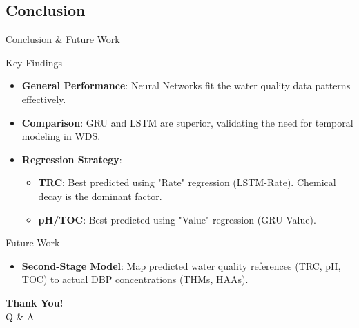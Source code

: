 \documentclass[xcolor=dvipsnames]{beamer}
\begin{document}
\subsection{Conclusion}
\begin{frame}{Conclusion \& Future Work}
  \footnotesize
  \begin{block}{Key Findings}
    \begin{itemize}
        \item \textbf{General Performance}: Neural Networks fit the water quality data patterns effectively.
        \item \textbf{Comparison}: GRU and LSTM are superior, validating the need for temporal modeling in WDS.
        \item \textbf{Regression Strategy}:
        \begin{itemize}
            \item \textbf{TRC}: Best predicted using "Rate" regression (LSTM-Rate). Chemical decay is the dominant factor.
            \item \textbf{pH/TOC}: Best predicted using "Value" regression (GRU-Value).
        \end{itemize}
    \end{itemize}
  \end{block}

  \begin{block}{Future Work}
    \begin{itemize}
        \item \textbf{Second-Stage Model}: Map predicted water quality references (TRC, pH, TOC) to actual DBP concentrations (THMs, HAAs).
    \end{itemize}
  \end{block}
\end{frame}

\begin{frame}
  \centering
  \Huge \textbf{Thank You!} \\
  \vspace{1cm}
  \Large Q \& A
\end{frame}
\end{document}
